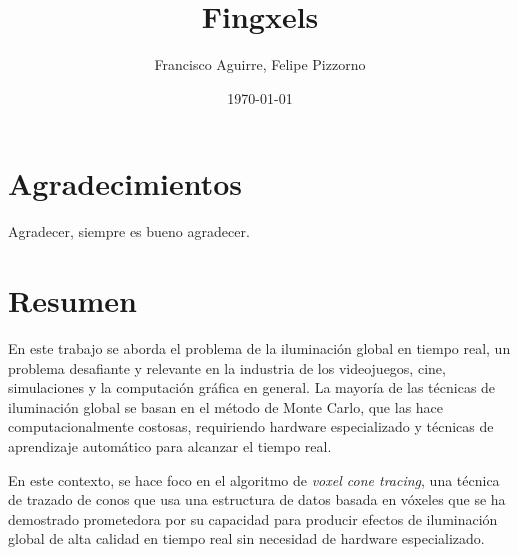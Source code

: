 \documentclass{prgrado}
\title{Fingxels}
\author{Francisco Aguirre, Felipe Pizzorno} %
\date{\today} %
\begin{document}

\frontmatter %

\maketitle


\chapter*{Agradecimientos}

Agradecer, siempre es bueno agradecer. %


\chapter*{Resumen}


En este trabajo se aborda el problema de la iluminación global en tiempo real, un problema desafiante y relevante en la industria de los videojuegos, cine, simulaciones y la computación gráfica en general.
La mayoría de las técnicas de iluminación global se basan en el método de Monte Carlo, que las hace computacionalmente costosas, requiriendo hardware especializado y técnicas de aprendizaje automático para alcanzar el tiempo real.

En este contexto, se hace foco en el algoritmo de \textit{voxel cone tracing}, una técnica de trazado de conos que usa una estructura de datos basada en vóxeles que se ha demostrado prometedora por su capacidad para producir efectos de iluminación global de alta calidad en tiempo real sin necesidad de hardware especializado.
\end{document}
